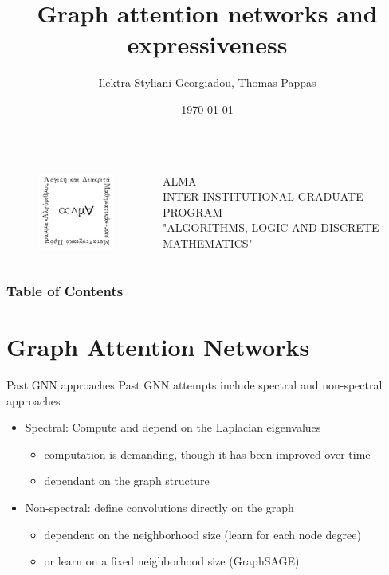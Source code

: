 \documentclass{beamer}
\title[]{Graph attention networks and expressiveness}
\author[Georgiadou, Pappas]{Ilektra Styliani Georgiadou, Thomas Pappas}
\institute[ALMA]{}
\date{\today}
\theoremstyle{definition}
\begin{document}


\begin{frame}[plain]
  \titlepage
  \begin{columns}
    \begin{figure}
      \centering
      \includegraphics[scale=0.6]{alma_logo.png}
    \end{figure}
ALMA \\
\tiny{INTER-INSTITUTIONAL GRADUATE PROGRAM \\
"ALGORITHMS, LOGIC AND DISCRETE MATHEMATICS"}
\end{columns}
\end{frame}

\begin{frame}
    \frametitle{Table of Contents}
    \tableofcontents[hideallsubsections]
\end{frame}


\section{Graph Attention Networks}

\begin{frame}{Past GNN approaches}
    Past GNN attempts include spectral and non-spectral approaches
    \begin{itemize}
        \item Spectral: Compute and depend on the Laplacian eigenvalues
            \begin{itemize}
                \item computation is demanding, though it has been improved over time
                \item dependant on the graph structure
            \end{itemize}
        \item Non-spectral: define convolutions directly on the graph
            \begin{itemize}
                \item dependent on the neighborhood size (learn for each node degree)
                \item or learn on a fixed neighborhood size (GraphSAGE)
            \end{itemize}
    \end{itemize}
\end{frame}
\end{document}
